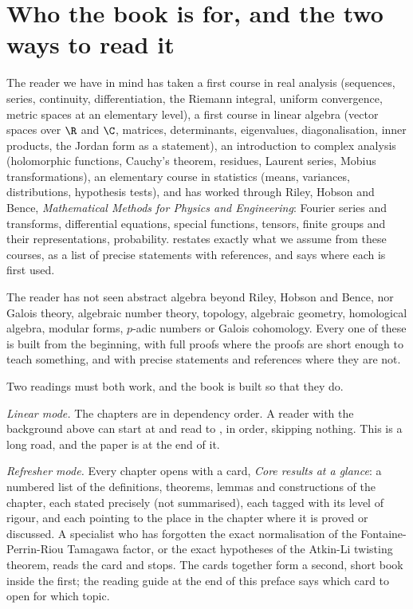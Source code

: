 \section*{Who the book is for, and the two ways to read it}

The reader we have in mind has taken a first course in real analysis (sequences, series,
continuity, differentiation, the Riemann integral, uniform convergence, metric spaces at an
elementary level), a first course in linear algebra (vector spaces over $\R$ and $\C$, matrices,
determinants, eigenvalues, diagonalisation, inner products, the Jordan form as a statement), an
introduction to complex analysis (holomorphic functions, Cauchy's theorem, residues, Laurent
series, Mobius transformations), an elementary course in statistics (means, variances,
distributions, hypothesis tests), and has worked through Riley, Hobson and Bence,
\emph{Mathematical Methods for Physics and Engineering}: Fourier series and transforms,
differential equations, special functions, tensors, finite groups and their representations,
probability.  restates exactly what we assume from these courses, as a list of
precise statements with references, and says where each is first used.

The reader has not seen abstract algebra beyond Riley, Hobson and Bence, nor Galois theory,
algebraic number theory, topology, algebraic geometry, homological algebra, modular forms,
$p$-adic numbers or Galois cohomology. Every one of these is built from the beginning, with full
proofs where the proofs are short enough to teach something, and with precise statements and
references where they are not.

Two readings must both work, and the book is built so that they do.

\emph{Linear mode.} The chapters are in dependency order. A reader with the background above can
start at  and read to , in order, skipping nothing. This is
a long road, and the paper is at the end of it.

\emph{Refresher mode.} Every chapter opens with a card, \emph{Core results at a glance}: a
numbered list of the definitions, theorems, lemmas and constructions of the chapter, each stated
precisely (not summarised), each tagged with its level of rigour, and each pointing to the place in
the chapter where it is proved or discussed. A specialist who has forgotten the exact normalisation
of the Fontaine-Perrin-Riou Tamagawa factor, or the exact hypotheses of the Atkin-Li twisting
theorem, reads the card and stops. The cards together form a second, short book inside the first;
the reading guide at the end of this preface says which card to open for which topic.


